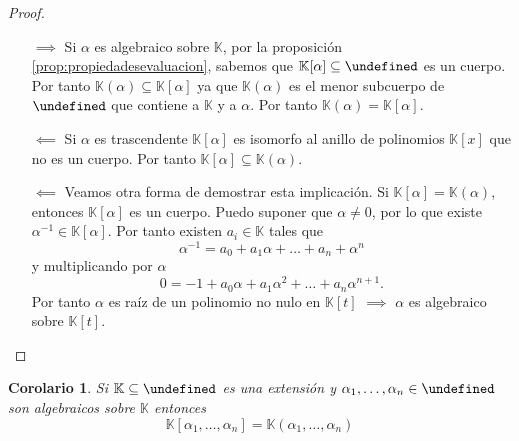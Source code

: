 \documentclass[10pt, spanish]{report}
\newtheorem{cor}{Corolario}[tma]
\theoremstyle{definition}
\theoremstyle{custom}
\theoremstyle{remark}
\newcommand{\K}{\mathbb{K}}
\let\L\undefined
\newcommand{\L}{\mathbb{L}}
\newcommand{\fecha}[1]{\marginpar{\underline{\footnotesize{#1}}}}
\begin{document}
\fecha{23/02}
\begin{proof}\hspace{1em}
    \begin{itemize}[itemindent=14pt]
        \item[$\implies$]  Si $\alpha$ es algebraico sobre $\K$, por la proposición
            \ref{prop:propiedadesevaluacion}, sabemos que
            $\K[\alpha]\subseteq\L$ es un cuerpo. Por tanto
            $\K(\alpha)\subseteq\K[\alpha]$ ya que $\K(\alpha)$ es el menor
            subcuerpo de $\L$ que contiene a $\K$ y a $\alpha$. Por tanto
            $\K(\alpha)=\K[\alpha]$.
        \item[$\impliedby$]  Si $\alpha$ es trascendente $\K[\alpha]$ es
            isomorfo al anillo de polinomios $\K[x]$ que no es un cuerpo. Por
            tanto $\K[\alpha]\subseteq\K(\alpha)$.
        \item[$\impliedby$] Veamos otra forma de demostrar esta implicación. Si
            $\K[\alpha]=\K(\alpha)$, entonces $\K[\alpha]$ es un cuerpo. Puedo
            suponer que $\alpha\neq0$, por lo que existe $\alpha^{-1}\in
            \K[\alpha]$. Por tanto existen $a_i\in \K$ tales que
            \[\alpha^{-1}=a_0+a_1\alpha+\ldots+a_n+\alpha^n\] y multiplicando
            por $\alpha$ \[0=-1+a_0\alpha+a_1\alpha^2+\ldots+a_n\alpha^{n+1}.\]
            Por tanto $\alpha$ es raíz de un polinomio no nulo en $\K[t]$
            $\implies$
            $\alpha$ es algebraico sobre $\K[t]$.
    \end{itemize}
    \vspace{-1.75em}
\end{proof}

\begin{cor}
    Si $\K\subseteq\L$ es una extensión y $\alpha_1,\ldots,\alpha_n\in\L$ son
    algebraicos sobre $\K$ entonces \[\K[\alpha_1,\ldots,\alpha_n]=
    \K(\alpha_1,\ldots,\alpha_n)\]
\end{cor}
\end{document}
